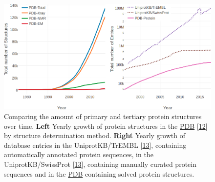 \documentclass[11pt,a4paper,twoside]{book}
\theoremstyle{definition}
\theoremstyle{definition}
\theoremstyle{remark}
\begin{document}
\begin{figure}
\includegraphics[width=1\linewidth]{img/intro/pdb_uniprot_stats} \caption{Comparing the amount of primary and tertiary
protein structures over time. \textbf{Left} Yearly growth of protein
structures in the \protect\hyperlink{abbrev}{PDB}
{[}\protect\hyperlink{ref-Berman2000}{12}{]} by structure determination
method. \textbf{Right} Yearly growth of database entries in the
UniprotKB/TrEMBL
{[}\protect\hyperlink{ref-TheUniProtConsortium2017}{13}{]}, containing
automatically annotated protein sequences, in the UniprotKB/SwissProt
{[}\protect\hyperlink{ref-TheUniProtConsortium2017}{13}{]}, containing
manually curated protein sequences and in the
\protect\hyperlink{abbrev}{PDB} containing solved protein structures.}\label{fig:seq-str-gap}
\end{figure}
\end{document}
